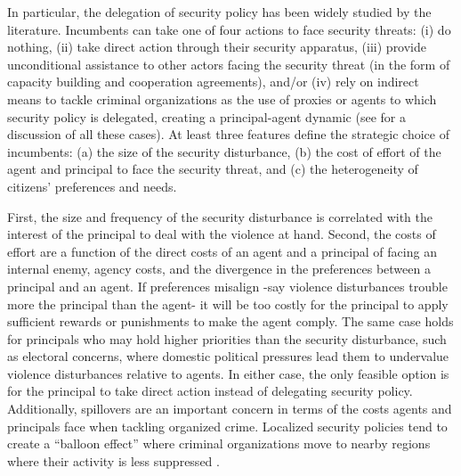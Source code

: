 In particular, the delegation of security policy has been widely studied by the literature. Incumbents can take one of four actions to face security threats: (i) do nothing, (ii) take direct action through their security apparatus, (iii) provide unconditional assistance to other actors facing the security threat (in the form of capacity building and cooperation agreements), and/or (iv) rely on indirect means to tackle criminal organizations as the use of proxies or agents to which security policy is delegated, creating a principal-agent dynamic (see \citet{berman_lake_2019} for a discussion of all these cases). At least three features define the strategic choice of incumbents: (a) the size of the security disturbance, (b) the cost of effort of the agent and principal to face the security threat, and (c) the heterogeneity of citizens' preferences and needs. 

First, the size and frequency of the security disturbance is correlated with the interest of the principal to deal with the violence at hand. Second, the costs of effort are a function of the direct costs of an agent and a principal of facing an internal enemy, agency costs, and the divergence in the preferences between a principal and an agent. If preferences misalign -say violence disturbances trouble more the principal than the agent- it will be too costly for the principal to apply sufficient rewards or punishments to make the agent comply. The same case holds for principals who may hold higher priorities than the security disturbance, such as electoral concerns, where domestic political pressures lead them to undervalue violence disturbances relative to agents. In either case, the only feasible option is for the principal to take direct action instead of delegating security policy. Additionally, spillovers are an important concern in terms of the costs agents and principals face when tackling organized crime. Localized security policies tend to create a ``balloon effect'' where criminal organizations move to nearby regions where their activity is less suppressed \citep{shirk_wallman_2015}.

